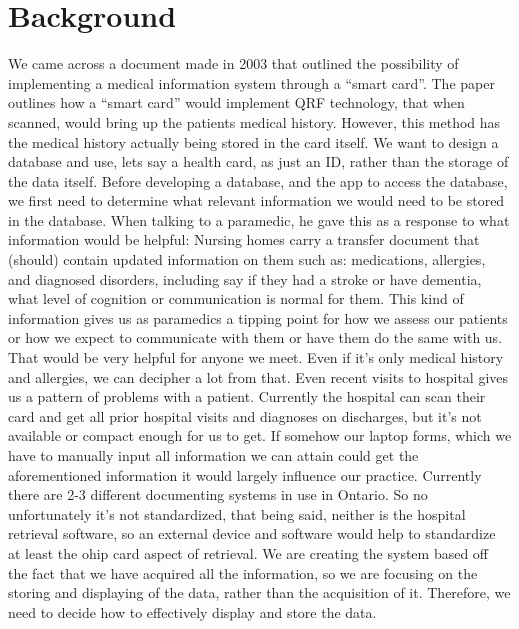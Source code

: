 
\section{Background}

We came across a document made in 2003 that outlined the possibility of implementing a medical information system through a “smart card”. The paper outlines how a “smart card” would implement QRF technology, that when scanned, would bring up the patients medical history. However, this method has the medical history actually being stored in the card itself. We want to design a database and use, lets say a health card, as just an ID, rather than the storage of the data itself.
Before developing a database, and the app to access the database, we first need to determine what relevant information we would need to be stored in the database. When talking to a paramedic, he gave this as a response to what information would be helpful:
Nursing homes carry a transfer document that (should) contain updated information on them such as: medications, allergies, and diagnosed disorders, including say if they had a stroke or have dementia, what level of cognition or communication is normal for them. This kind of information gives us as paramedics a tipping point for how we assess our patients or how we expect to communicate with them or have them do the same with us. That would be very helpful for anyone we meet. Even if it's only medical history and allergies, we can decipher a lot from that. Even recent visits to hospital gives us a pattern of problems with a patient. Currently the hospital can scan their card and get all prior hospital visits and diagnoses on discharges, but it's not available or compact enough for us to get. If somehow our laptop forms, which we have to manually input all information we can attain could get the aforementioned information it would largely influence our practice. Currently there are 2-3 different documenting systems in use in Ontario. So no unfortunately it's not standardized, that being said, neither is the hospital retrieval software, so an external device and software would help to standardize at least the ohip card aspect of retrieval.
We are creating the system based off the fact that we have acquired all the information, so we are focusing on the storing and displaying of the data, rather than the acquisition of it. Therefore, we need to decide how to effectively display and store the data. 


